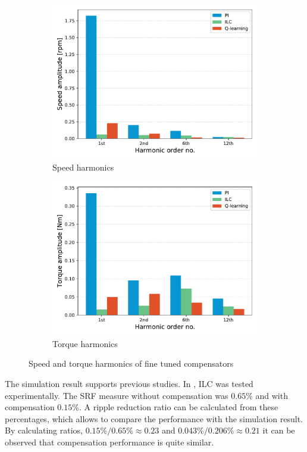 \begin{figure}[htb]
\centering
\begin{subfigure}{0.5\textwidth}
  \centering
  \includegraphics[width=\textwidth]{images/simulations_ms4887_tuned_speed_pi_ilc_qlr.pdf}
  \caption{Speed harmonics}
\end{subfigure}%
\begin{subfigure}{.5\textwidth}
  \centering
  \includegraphics[width=\textwidth]{images/simulations_ms4887_tuned_torque_pi_ilc_qlr.pdf}
  \caption{Torque harmonics}
\end{subfigure}
\caption{Speed and torque harmonics of fine tuned compensators}
\label{sim:well-tuned}
\end{figure}
The simulation result supports previous studies. In \cite{ILC:2005}, ILC was tested experimentally. The SRF measure without compensation was $0.65\%$ and with compensation $0.15\%$. A ripple reduction ratio can be calculated from these percentages, which allows to compare the performance with the simulation result. By calculating ratios, $0.15\% / 0.65\% \approx 0.23$ and $0.043\% / 0.206\% \approx 0.21$ it can be observed that compensation performance is quite similar.


